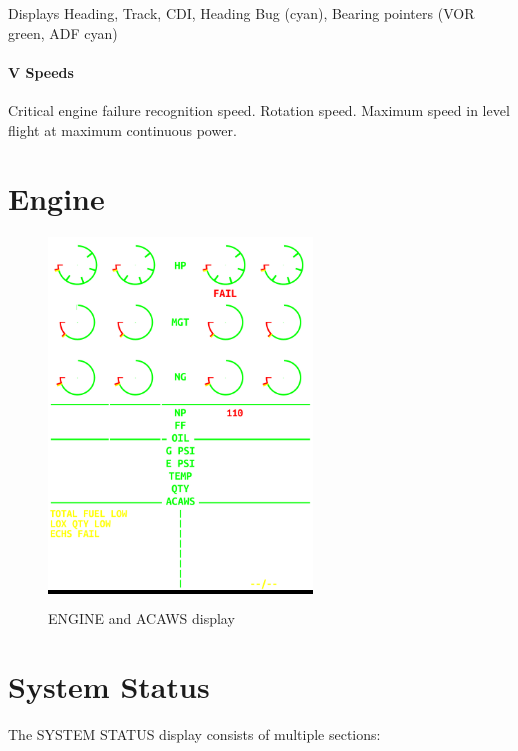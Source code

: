 Displays Heading, Track, \gls{CDI}, Heading Bug (cyan), Bearing pointers (VOR green, ADF cyan)

\paragraph*{V Speeds}

\begin{itemize}
   Critical engine failure recognition speed.
   Rotation speed.
   Maximum speed in level flight at maximum continuous power.
\end{itemize}

\newpage
\section{Engine}

\begin{figure}[h]
  \centering
  \colorbox{black}{\includegraphics[width=7cm]{figures/hdd/EICAS}}
  \caption{ENGINE and ACAWS display}
\end{figure}

\newpage
\section{System Status}

The SYSTEM STATUS display consists of multiple sections:

